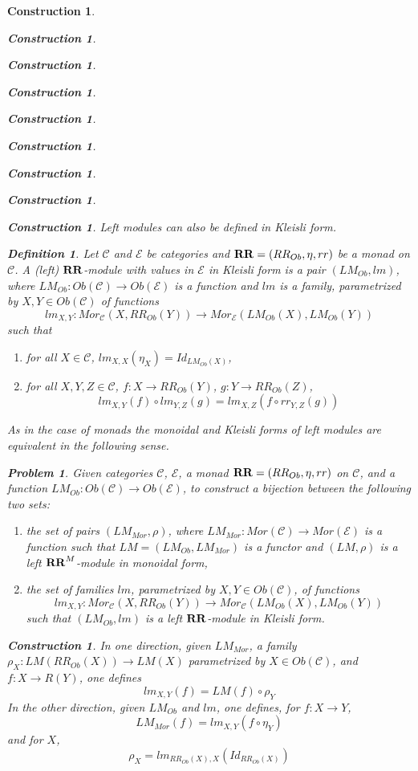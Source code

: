\documentclass[onecolumn,12pt]{amsart}
\newtheorem{definition}[proposition]{Definition}
\numberwithin{proposition}{subsection}
\newtheorem{problem}[proposition]{Problem}
\newtheorem{construction}[proposition]{Construction}
\newcommand{\sr}{\rightarrow}
\newcommand{\RR}{{\bf RR}}
\newcommand{\C}{{\mathcal C}}
\newcommand{\E}{{\mathcal E}}
\begin{document}
\begin{construction}
\begin{construction}
\begin{construction}
\begin{construction}
\begin{construction}
\begin{construction}
\begin{construction}
\begin{construction}
\begin{construction}
Left modules can also be defined in Kleisli form. 
%
\begin{definition}
\label{2017.04.15.def1} 
Let $\C$ and $\E$ be categories and
$\RR=(RR_{Ob},\eta,rr)$ be a monad on $\C$. A {\em (left) $\RR$-module with values in
$\E$ in Kleisli form} is a pair $(LM_{Ob},lm)$, where $LM_{Ob}:Ob(\C)\sr
Ob(\E)$ is a function and $lm$ is a family, parametrized by $X,Y\in Ob(\C)$ of
functions
%
$$lm_{X,Y}:Mor_{\C}(X,RR_{Ob}(Y))\sr Mor_{\E}(LM_{Ob}(X),LM_{Ob}(Y))$$
%
such that
%
\begin{enumerate}
\item for all $X\in\C$, $lm_{X,X}(\eta_X)=Id_{LM_{Ob}(X)}$,
\item for all $X,Y,Z\in\C$, $f:X\sr RR_{Ob}(Y)$, $g:Y\sr RR_{Ob}(Z)$, 
%
$$lm_{X,Y}(f)\circ lm_{Y,Z}(g)=lm_{X,Z}(f\circ rr_{Y,Z}(g))$$
\end{enumerate}
\end{definition}
%
As in the case of monads the monoidal and Kleisli forms of left modules are
equivalent in the following sense.
%
\begin{problem}
\label{2017.04.03.prob1} 
Given categories $\C$, $\E$, a monad
$\RR=(RR_{Ob},\eta,rr)$ on $\C$, and a function $LM_{Ob}:Ob(\C)\sr Ob(\E)$, to
construct a bijection between the following two sets:
%
\begin{enumerate}
\item the set of pairs $(LM_{Mor},\rho)$, where $LM_{Mor}:Mor(\C)\sr Mor(\E)$ is
  a function such that $LM=(LM_{Ob},LM_{Mor})$ is a functor and $(LM,\rho)$ is
  a left $\RR^M$-module in monoidal form,
\item the set of families $lm$, parametrized by $X,Y\in Ob(\C)$, of functions
%
$$lm_{X,Y}:Mor_{\C}(X,RR_{Ob}(Y))\sr Mor_{\C}(LM_{Ob}(X),LM_{Ob}(Y))$$
%
such that $(LM_{Ob},lm)$ is a left $\RR$-module in Kleisli form. 
\end{enumerate}
\end{problem}
%
\begin{construction}\rm\label{2017.04.03.constr1}
In one direction, given $LM_{Mor}$, a family $\rho_X:LM(RR_{Ob}(X))\sr LM(X)$
parametrized by $X\in Ob(\C)$, and $f:X\sr R(Y)$, one defines
%
\begin{equation}\label{2017.04.09.eq4}
lm_{X,Y}(f)=LM(f)\circ \rho_Y
\end{equation}%
%
In the other direction, given $LM_{Ob}$ and $lm$, one defines, for $f:X\sr Y$, 
%
\begin{equation}\label{2017.04.09.eq3}
LM_{Mor}(f)=lm_{X,Y}(f\circ \eta_Y)
\end{equation}%
%
and for $X$, 
%
$$\rho_X=lm_{RR_{Ob}(X),X}(Id_{RR_{Ob}(X)})$$


\end{construction}
\end{construction}
\end{construction}
\end{construction}
\end{construction}
\end{construction}
\end{construction}
\end{construction}
\end{construction}
\end{construction}
\end{document}
